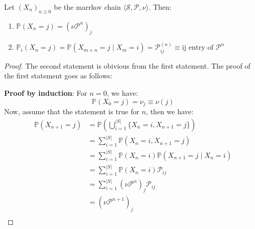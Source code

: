 \begin{theorem}
    Let \({(X_n)}_{n \geq 0}\) be the marrkov chain \(\langle \mathcal{S} , \mathcal{P} , \nu \rangle\).
    Then:
    \begin{enumerate}
        \item \(\mathbb{P} (X_n = j) = {(\nu \mathcal{P} ^{n})}_{j} \)
        \item \(\mathbb{P}_i (X_n = j) = \mathbb{P} \left( X_{m+n} = j \mid X_m = i \right) 
        = \mathcal{P}_{ij}^{(n)}\equiv \text{ij entry of } \mathcal{P} ^{n}\)
    \end{enumerate}
\end{theorem}
\begin{proof}
    The second statement is obivious from the first statement. The proof of the first statement goes as follows:

    \textbf{Proof by induction}: For \(n=0\), we have:
    \[
        \mathbb{P} (X_0 = j) = \nu _j \equiv \nu(j)  
    \]
    Now, assume that the statement is true for \(n\), then we have:
    \[
        \begin{aligned}
            \mathbb{P} (X_{n+1} = j) &= \mathbb{P} \left( 
                \bigcup_{i=1}^{ |S| } \{X_n = i , X_{n+1} = j\}
             \right) \\
                &= \sum_{i=1}^{ |S| } \mathbb{P} (X_n = i, X_{n+1} = j) \\
                &= \sum_{i=1}^{ |S| } \mathbb{P} (X_n = i) \mathbb{P} (X_{n+1} = j \mid X_n = i) \\
                &= \sum_{i=1}^{ |S| } \mathbb{P} (X_n = i) \mathcal{P}_{ij} \\
                &= \sum_{i=1}^{ |S| } {(\nu \mathcal{P}^n)}_j \mathcal{P}_{ij} \\
                &= {(\nu \mathcal{P}^{n+1})}_j \\
        \end{aligned}
    \]
\end{proof}



